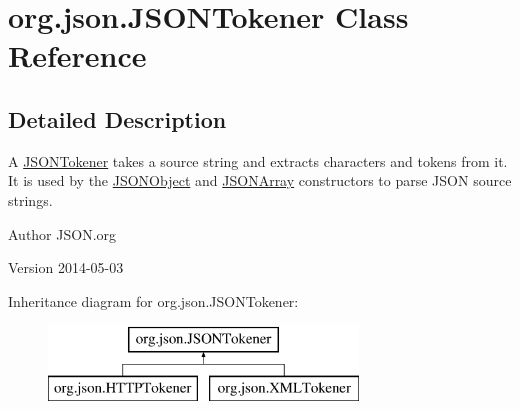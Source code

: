 \hypertarget{classorg_1_1json_1_1JSONTokener}{\section{org.\-json.\-J\-S\-O\-N\-Tokener Class Reference}
\label{classorg_1_1json_1_1JSONTokener}
}


\subsection{Detailed Description}
A \hyperlink{classorg_1_1json_1_1JSONTokener}{J\-S\-O\-N\-Tokener} takes a source string and extracts characters and tokens from it. It is used by the \hyperlink{classorg_1_1json_1_1JSONObject}{J\-S\-O\-N\-Object} and \hyperlink{classorg_1_1json_1_1JSONArray}{J\-S\-O\-N\-Array} constructors to parse J\-S\-O\-N source strings. \begin{DoxyAuthor}{Author}
J\-S\-O\-N.\-org 
\end{DoxyAuthor}
\begin{DoxyVersion}{Version}
2014-\/05-\/03 
\end{DoxyVersion}
Inheritance diagram for org.\-json.\-J\-S\-O\-N\-Tokener\-:\begin{figure}[H]
\begin{center}
\leavevmode
\includegraphics[height=2.000000cm]{classorg_1_1json_1_1JSONTokener}
\end{center}
\end{figure}
